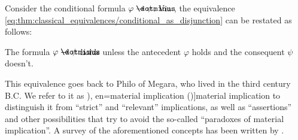 \begin{concept}\label{con:material_implication}
  Consider the conditional formula \( \varphi \synimplies \psi \). Via , the equivalence \eqref{eq:thm:classical_equivalences/conditional_as_disjunction} can be restated as follows:
  \begin{displayquote}
    The formula \( \varphi \synimplies \psi \) holds unless the antecedent \( \varphi \) holds and the consequent \( \psi \) doesn't.
  \end{displayquote}

  This equivalence goes back to Philo of Megara, who lived in the third century B.C. We refer to it as \term[ru=материальная импликация (\cite[74]{КолмогоровДрагалин2006}), en=material implication (\cite[9]{Kleene2002Logic})]{material implication} to distinguish it from \enquote{strict} and \enquote{relevant} implications, as well as \enquote{assertions} and other possibilities that try to avoid the so-called \enquote{paradoxes of material implication}. A survey of the aforementioned concepts has been written by .
\end{concept}
